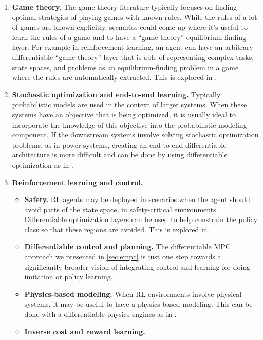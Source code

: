 \begin{enumerate}
\item \textbf{Game theory.}
  The game theory literature typically focuses on finding
  optimal strategies of playing games with known rules.
  While the rules of a lot of games are known explicitly,
  scenarios could come up where it's useful to learn the
  rules of a game and to have a ``game theory''
  equilibrium-finding layer.
  For example in reinforcement learning, an agent can have an
  arbitrary differentiable ``game theory'' layer that is able
  of representing complex tasks, state spaces, and
  problems as an equilibrium-finding problem in a game
  where the rules are automatically extracted.
  This is explored in
  \citet{ling2018game}.
\item \textbf{Stochastic optimization and end-to-end learning.}
  Typically probabilistic models are used in the context of
  larger systems. When these systems have an objective
  that is being optimized, it is usually ideal to incorporate
  the knowledge of this objective into the probabilistic modeling
  component.
  If the downstream systems involve solving
  stochastic optimization problems, as in power-systems,
  creating an end-to-end differentiable architecture is
  more difficult and can be done by using
  differentiable optimization as in \citet{donti2017task}.
  \newpage
\item \textbf{Reinforcement learning and control.}
  \begin{itemize}
  \item \textbf{Safety.} RL agents may be deployed in scenarios when
    the agent should avoid parts of the state space,
    \eg in safety-critical environments.
    Differentiable optimization layers can be used
    to help constrain the policy class so that these
    regions are avoided.
    This is explored in
    \citet{dalal2018safe,pham2018optlayer}.
  \item \textbf{Differentiable control and planning.}
    The differentiable MPC approach we presented in \cref{sec:empc}
    is just one step towards a significantly broader vision
    of integrating control and learning for doing imitation
    or policy learning.
  \item \textbf{Physics-based modeling.}
    When RL environments involve physical systems,
    it may be useful to have a physics-based modeling.
    This can be done with a differentiable
    physics engines as in \citet{de2018end}.
  \item \textbf{Inverse cost and reward learning.}

\end{itemize}
\end{enumerate}
